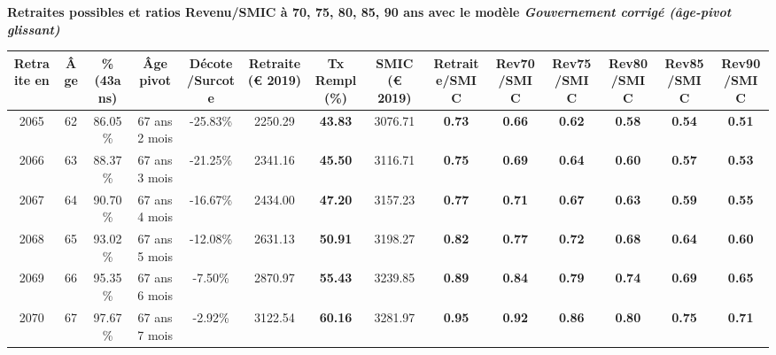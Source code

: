  \vspace{0.1cm} 
{\bf \noindent Retraites possibles et ratios Revenu/SMIC à 70, 75, 80, 85, 90 ans avec le modèle \emph{Gouvernement corrigé (âge-pivot glissant)}}  
 
\begin{adjustbox}{max width=\textwidth} 
\begin{tabular}[htb]{|c|c||c|c|c||c|c||c||c|c|c|c|c|c|} 
\hline 
 Retraite en &  Âge &  \%(43ans) &  Âge pivot &  Décote/Surcote &  Retraite (\euro{} 2019) &  Tx Rempl(\%) &  SMIC (\euro{} 2019) &  Retraite/SMIC &  Rev70/SMIC &  Rev75/SMIC &  Rev80/SMIC &  Rev85/SMIC &  Rev90/SMIC \\ 
\hline \hline 
 2065 &  62 &  86.05\% &  67 ans 2 mois &  -25.83\% &  2250.29 &  {\bf 43.83} &  3076.71 &  {\bf {\color{red} 0.73}} &  {\bf {\color{red} 0.66}} &  {\bf {\color{red} 0.62}} &  {\bf {\color{red} 0.58}} &  {\bf {\color{red} 0.54}} &  {\bf {\color{red} 0.51}} \\ 
\hline 
 2066 &  63 &  88.37\% &  67 ans 3 mois &  -21.25\% &  2341.16 &  {\bf 45.50} &  3116.71 &  {\bf {\color{red} 0.75}} &  {\bf {\color{red} 0.69}} &  {\bf {\color{red} 0.64}} &  {\bf {\color{red} 0.60}} &  {\bf {\color{red} 0.57}} &  {\bf {\color{red} 0.53}} \\ 
\hline 
 2067 &  64 &  90.70\% &  67 ans 4 mois &  -16.67\% &  2434.00 &  {\bf 47.20} &  3157.23 &  {\bf {\color{red} 0.77}} &  {\bf {\color{red} 0.71}} &  {\bf {\color{red} 0.67}} &  {\bf {\color{red} 0.63}} &  {\bf {\color{red} 0.59}} &  {\bf {\color{red} 0.55}} \\ 
\hline 
 2068 &  65 &  93.02\% &  67 ans 5 mois &  -12.08\% &  2631.13 &  {\bf 50.91} &  3198.27 &  {\bf {\color{red} 0.82}} &  {\bf {\color{red} 0.77}} &  {\bf {\color{red} 0.72}} &  {\bf {\color{red} 0.68}} &  {\bf {\color{red} 0.64}} &  {\bf {\color{red} 0.60}} \\ 
\hline 
 2069 &  66 &  95.35\% &  67 ans 6 mois &  -7.50\% &  2870.97 &  {\bf 55.43} &  3239.85 &  {\bf {\color{red} 0.89}} &  {\bf {\color{red} 0.84}} &  {\bf {\color{red} 0.79}} &  {\bf {\color{red} 0.74}} &  {\bf {\color{red} 0.69}} &  {\bf {\color{red} 0.65}} \\ 
\hline 
 2070 &  67 &  97.67\% &  67 ans 7 mois &  -2.92\% &  3122.54 &  {\bf 60.16} &  3281.97 &  {\bf {\color{red} 0.95}} &  {\bf {\color{red} 0.92}} &  {\bf {\color{red} 0.86}} &  {\bf {\color{red} 0.80}} &  {\bf {\color{red} 0.75}} &  {\bf {\color{red} 0.71}} \\ 
\hline 
\hline 
\end{tabular} 
\end{adjustbox} 
 
